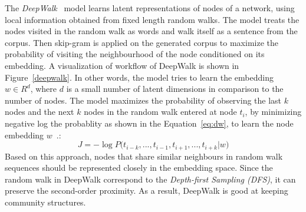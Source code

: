 The \emph{DeepWalk}~ model  learns latent representations of nodes of a network, using  local information obtained from fixed length
random walks. The model treats the nodes visited in the random walk as words and walk itself as  a sentence from the corpus. Then skip-gram is applied on the generated corpus to maximize the probability of visiting the neighbourhood of the node conditioned on its embedding. A visualization of workflow of DeepWalk is shown in Figure~\ref{deepwalk}.  In other words, the model tries to learn the embedding $w\in R^{ d} $, where $d$ is a small number of latent dimensions in comparison to the number of nodes. The model maximizes the probability of observing the last $k$
nodes and the next $k$ nodes in the random walk entered at node
$t_{i}$, by minimizing negative log the probablity as shown in the Equation~\ref{eq:dw}, to learn the node embedding $w$~.: 
\begin{equation}
J=-\log { P( } t_{ { i−k } },...,t_{ i−1 },t_{ i+1 },...,t_{ i+k }|w )
\label{eq:dw}
\end{equation}
Based on this approach, nodes that share similar neighbours in random walk sequences should be represented closely in the embedding space. Since the random walk in DeepWalk correspond to the \emph{Depth-first Sampling (DFS)}, it can preserve the second-order proximity. As a result, DeepWalk is good at keeping community structures. 
